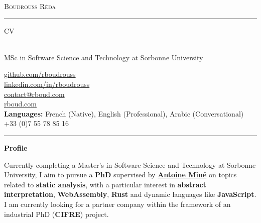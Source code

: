 \documentclass[10pt,A4]{article}
\newcommand{\cvsection}[1]
{
	\begin{center}
		\large\textcolor{sectcol}{\textbf{#1}}
	\end{center}
}
\newcommand{\metasection}[2]
{
\footnotesize{#2} \hspace*{\fill} \footnotesize{#1}\\[1pt]
}
\begin{document}
\pagestyle{fancy}	









\vspace{-8pt}
\begin{center}
    {\HUGE \textsc{Boudrouss Réda} \textcolor{sectcol}{\rule[-1mm]{1mm}{0.9cm}} \textsc{CV}}\\[2pt]
    {\small MSc in Software Science and Technology at Sorbonne University}
\end{center}

\vspace{6pt}

\metasection{\href{https://github.com/rboudrouss}{github.com/rboudrouss}}{}
\metasection{\href{https://www.linkedin.com/in/rboudrouss}{linkedin.com/in/rboudrouss}}{}
\metasection{\href{mailto:contact@rboud.com}{contact@rboud.com}}{}
\metasection{\href{https://rboud.com}{rboud.com}}{}
\metasection{+33 (0)7 55 78 85 16}{\textbf{Languages:} French (Native), English (Professional), Arabic (Conversational)}

\vspace{-15pt}
\textcolor{softcol}{\hrule}

\normalsize

\cvsection{Profile}
Currently completing a Master's in Software Science and Technology at Sorbonne University, I aim to pursue a \textbf{PhD} supervised by \href{https://mine.perso.lip6.fr/index.html.fr}{\textbf{Antoine Miné}} on topics related to \textbf{static analysis}, with a particular interest in \textbf{abstract interpretation}, \textbf{WebAssembly}, \textbf{Rust} and dynamic languages like \textbf{JavaScript}. \\
I am currently looking for a partner company within the framework of an industrial PhD (\textbf{CIFRE}) project.
\end{document}
